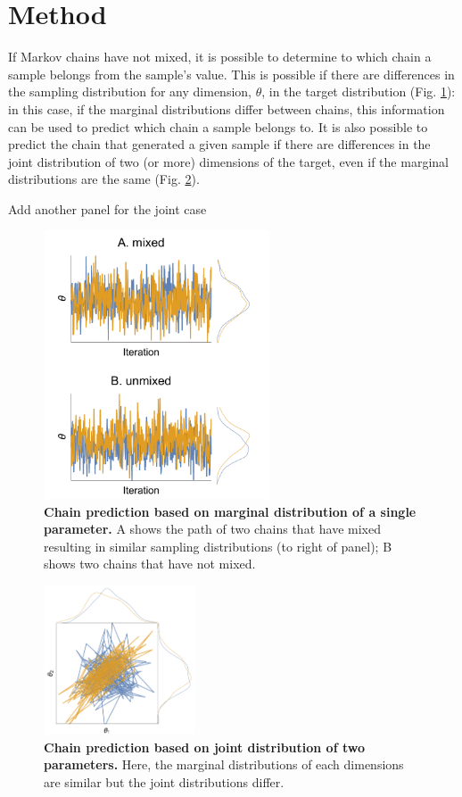 \documentclass{article}
\begin{document}
\section{Method}\label{sec:method}
If Markov chains have not mixed, it is possible to determine to which chain a sample belongs from the sample's value. This is possible if there are differences in the sampling distribution for any dimension, $\theta$, in the target distribution (Fig. \ref{fig:marginal}): in this case, if the marginal distributions differ between chains, this information can be used to predict which chain a sample belongs to. It  is also possible to predict the chain that generated a given sample if there are differences in the joint distribution of two (or more) dimensions of the target, even if the marginal distributions are the same (Fig. \ref{fig:joint}).

Add another panel for the joint case

\begin{figure}[h]
	\centerline{\includegraphics[width=0.6\textwidth]{../output/unmixed_1.pdf}}
	\caption{\textbf{Chain prediction based on marginal distribution of a single parameter.} A shows the path of two chains that have mixed resulting in similar sampling distributions (to right of panel); B shows two chains that have not mixed.}
	\label{fig:marginal}
\end{figure}

\begin{figure}[h]
	\centerline{\includegraphics[width=0.4\textwidth]{../output/unmixed_2.pdf}}
	\caption{\textbf{Chain prediction based on joint distribution of two parameters.} Here, the marginal distributions of each dimensions are similar but the joint distributions differ.}
	\label{fig:joint}
\end{figure}
\end{document}
